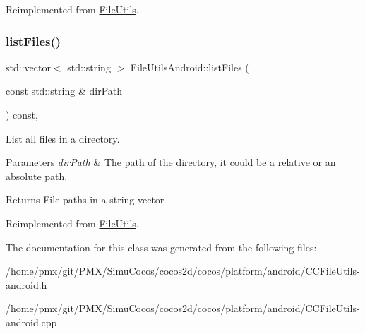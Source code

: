Reimplemented from \hyperlink{classFileUtils_aed08c5ac2854f3fb5c104386ab96a90c}{File\+Utils}.

\mbox{\label{classFileUtilsAndroid_a05bcda7dcc030c83573c7138caebad4c}} 
\subsubsection{\texorpdfstring{list\+Files()}{listFiles()}}
{\footnotesize\ttfamily std\+::vector$<$ std\+::string $>$ File\+Utils\+Android\+::list\+Files (\begin{DoxyParamCaption}\item[{const std\+::string \&}]{dir\+Path }\end{DoxyParamCaption}) const\hspace{0.3cm}{\ttfamily [override]}, {\ttfamily [virtual]}}

List all files in a directory.


\begin{DoxyParams}{Parameters}
{\em dir\+Path} & The path of the directory, it could be a relative or an absolute path. \\
\hline
\end{DoxyParams}
\begin{DoxyReturn}{Returns}
File paths in a string vector 
\end{DoxyReturn}


Reimplemented from \hyperlink{classFileUtils_a88fc43b561884e12a9a2d41a9e3b4df4}{File\+Utils}.



The documentation for this class was generated from the following files\+:\begin{DoxyCompactItemize}
\item 
/home/pmx/git/\+P\+M\+X/\+Simu\+Cocos/cocos2d/cocos/platform/android/C\+C\+File\+Utils-\/android.\+h\item 
/home/pmx/git/\+P\+M\+X/\+Simu\+Cocos/cocos2d/cocos/platform/android/C\+C\+File\+Utils-\/android.\+cpp\end{DoxyCompactItemize}

